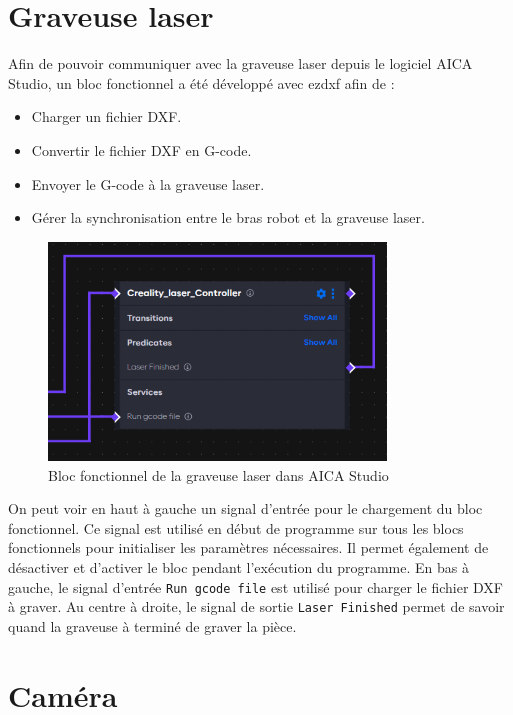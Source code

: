 \section{Graveuse laser}
Afin de pouvoir communiquer avec la graveuse laser depuis le logiciel AICA Studio, un bloc fonctionnel a été développé avec \gls{ezdxf} \cite{DXFDocs} afin de :
\begin{itemize}
    \item Charger un fichier DXF.
    \item Convertir le fichier DXF en G-code.
    \item Envoyer le G-code à la graveuse laser.
    \item Gérer la synchronisation entre le bras robot et la graveuse laser.
\end{itemize}

\begin{figure}[H]
    \centering
    \includegraphics[width=0.8\textwidth]{assets/figures/AICA_Laser_interface.png}
    \caption{Bloc fonctionnel de la graveuse laser dans AICA Studio}
    \label{fig:laser_interface}
\end{figure}

On peut voir en haut à gauche un signal d'entrée pour le chargement du bloc fonctionnel. Ce signal est utilisé en début de programme sur tous les blocs fonctionnels pour initialiser les paramètres nécessaires. Il permet également de désactiver et d'activer le bloc pendant l'exécution du programme. En bas à gauche, le signal d'entrée \texttt{Run gcode file} est utilisé pour charger le fichier DXF à graver. Au centre à droite, le signal de sortie \texttt{Laser Finished} permet de savoir quand la graveuse à terminé de graver la pièce.





\section{Caméra}

